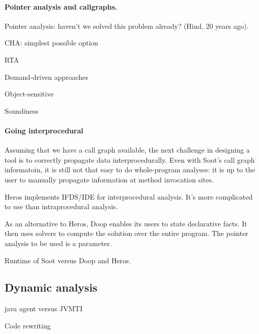 \paragraph{Pointer analysis and callgraphs.}

Pointer analysis: haven't we solved this problem already? (Hind, 20 years ago).

CHA: simplest possible option

RTA

Demand-driven approaches

Object-sensitive

Soundiness

\paragraph{Going interprocedural}
Assuming that we have a call graph available, the next challenge in
designing a tool is to correctly propagate data interprocedurally.
Even with Soot's call graph informatoin, it is still not that easy to
do whole-program analyses: it is up to the user to manually propagate
information at method invocation sites.

Heros implements IFDS/IDE for interprocedural analysis.
It's more complicated to use than intraprocedural analysis.

As an alternative to Heros, Doop enables its users to state
declarative facts. It then uses solvers to compute the solution over the
entire program. The pointer analysis to be used is a parameter.

Runtime of Soot versus Doop and Heros.


\subsection{Dynamic analysis}

java agent versus JVMTI

Code rewriting


